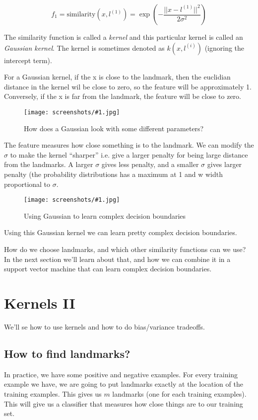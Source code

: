 \documentclass[a4, 12pt, english, USenglish]{scrreprt}
\newcommand{\screenshot}[2]{
\begin{figure}[htb]
\texttt{[image: screenshots/\#1.jpg]}
\label{#1}
\caption{#2}
\end{figure}}
\newcommand{\parens}[1]{\ensuremath{\left({#1}\right)}}
\newcommand{\mXXX}[1]{\marginpar{\tiny{\bf Rmz:} {\it #1}}}
\newcommand{\idx}[1]{{\em #1}\index{#1}}
\begin{document}
\[
f_1 = \mbox{similarity}(x, l^{(1)}) = \exp\parens{- \frac{||x - l^{(1)}||^2}{2 \sigma^2}}
\]

The similarity function is called a \idx{kernel} and this particular
kernel is called an \idx{Gaussian kernel}.  The kernel is sometimes
denoted as \(k(x, l^{(i)})\) (ignoring the intercept term).

For a Gaussian kernel, if the x is close to the landmark, then the
euclidian distance in the kernel wil be close to zero, so the feature
will be approximately 1.  Conversely, if the x is far from the
landmark, the feature will be close to zero.


\screenshot{landmarkexample}{How does a Gaussian look with some
  different parameters?}

The feature measures how close something is to the landmark.  We can
modify the \(\sigma\) to make the kernel ``sharper'' i.e. give a
larger penalty for being large distance from the landmarks.  A larger
\(\sigma\) gives less penalty, and a smaller \(\sigma\) gives larger
penalty (the probability distributions has a maximum at 1 and w width
proportional to \(\sigma\).

\screenshot{gaussianprediction}{Using Gaussian to learn complex
  decision boundaries}

Using this Gaussian kernel we can learn pretty complex decision
boundaries.

How do we choose landmarks, and which other similarity functions can
we use?  In the next section we'll learn about that, and how we can
combine it in a support vector machine that can learn complex decision boundaries.

\section{Kernels II}

We'll se how to use kernels and how to do bias/variance tradeoffs.   

\subsection{How to find landmarks?}

In practice, we have some positive and negative examples.  For every
training example we have, we are going to put landmarks exactly at the
location of the training examples.  This gives us \(m\) landmarks (one
for each training examples).  This will give us a classifier that
measures how close things are to our training  set.\mXXX{For a class?}
\end{document}
